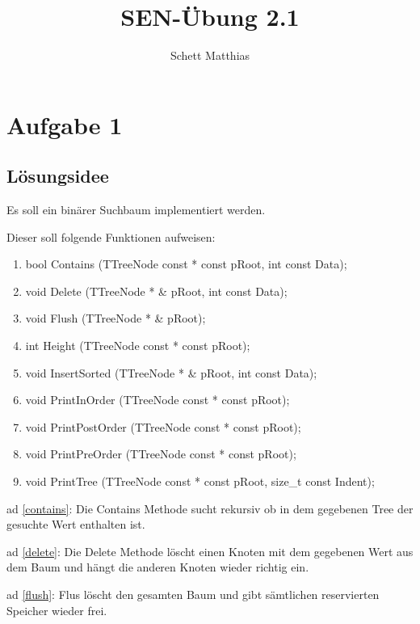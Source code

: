 \documentclass[10pt,a4paper]{scrartcl}
\author{Schett Matthias}
\title{SEN-Übung 2.1}
\begin{document}
\maketitle

\newpage
\section{Aufgabe 1}

\subsection{L\"{o}sungsidee}

Es soll ein binärer Suchbaum implementiert werden.

Dieser soll folgende Funktionen aufweisen:

\begin{enumerate}
	\item bool Contains (TTreeNode const * const pRoot, int const Data);\label{contains}
	\item void Delete (TTreeNode * \& pRoot, int const Data);\label{delete}
	\item void Flush (TTreeNode * \& pRoot);\label{flush}
	\item int Height (TTreeNode const * const pRoot);\label{height}
	\item void InsertSorted (TTreeNode * \& pRoot, int const Data); \label{insertsorted}
	\item void PrintInOrder (TTreeNode const * const pRoot);\label{inorder}
	\item void PrintPostOrder (TTreeNode const * const pRoot);\label{posrtorder}
	\item void PrintPreOrder (TTreeNode const * const pRoot);\label{preorder}
	\item void PrintTree (TTreeNode const * const pRoot, size\_t const Indent);\label{printtree}
\end{enumerate}

ad \ref{contains}:
Die Contains Methode sucht rekursiv ob in dem gegebenen Tree der gesuchte Wert enthalten ist.

ad \ref{delete}:
Die Delete Methode löscht einen Knoten mit dem gegebenen Wert aus dem Baum und hängt die anderen Knoten wieder richtig ein.

ad \ref{flush}:
Flus löscht den gesamten Baum und gibt sämtlichen reservierten Speicher wieder frei.
\end{document}

